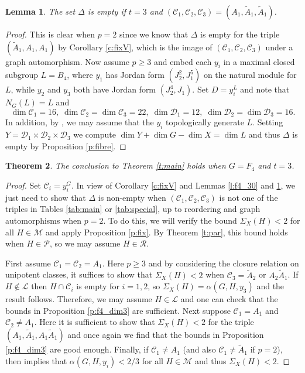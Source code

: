 \documentclass[twoside,a4paper,reqno,11pt]{amsart}
\renewcommand{\a}{\alpha}
\newcommand{\<}{\langle}
\renewcommand{\>}{\rangle}
\newcommand{\geqs}{\geqslant}
\renewcommand{\:}{\colon}
\theoremstyle{plain}
\newtheorem{thm}{Theorem}[section]
\newtheorem{lem}[thm]{Lemma}
\theoremstyle{definition}
\begin{document}
\begin{lem}\label{l:f4_300}
The set $\Delta$ is empty if $t=3$ and $(\mathcal{C}_1,\mathcal{C}_2,\mathcal{C}_3) = (A_1, \tilde{A}_1, \tilde{A}_1)$.
\end{lem}

\begin{proof}
This is clear when $p=2$ since we know that $\Delta$ is empty for the triple $(\tilde{A}_1, A_1,A_1)$ by Corollary \ref{c:fixV}, which is the image of $(\mathcal{C}_1,\mathcal{C}_2,\mathcal{C}_3)$ under a graph automorphism. Now assume $p \geqs 3$ and embed each $y_i$ in a maximal closed subgroup $L = B_4$, where $y_1$ has Jordan form $(J_2^2,J_1^5)$ on the natural module for $L$, while $y_2$ and $y_3$ both have Jordan form $(J_2^4,J_1)$. Set $D = y_i^L$ and note that 
$N_G(L) = L$ and 
\[
\dim \mathcal{C}_1 = 16, \; \dim \mathcal{C}_2 = \dim \mathcal{C}_3 = 22, \; \dim \mathcal{D}_1 = 12, \; \dim \mathcal{D}_2 = \dim \mathcal{D}_3 = 16.
\]
In addition, by \cite[Theorem 7]{BGG2}, we may assume that the $y_i$ topologically generate $L$. Setting $Y = \mathcal{D}_1 \times \mathcal{D}_2 \times \mathcal{D}_3$ we compute $\dim Y + \dim G - \dim X =\dim L$ and thus $\Delta$ is empty by Proposition \ref{p:fibre}.
\end{proof}

\begin{thm}\label{t:f4_3}
The conclusion to Theorem \ref{t:main} holds when $G = F_4$ and $t=3$.
\end{thm}

\begin{proof}
Set $\mathcal{C}_i = y_i^G$. In view of Corollary \ref{c:fixV} and Lemmas \ref{l:f4_30} and \ref{l:f4_300}, we just need to show that $\Delta$ is non-empty when $(\mathcal{C}_1,\mathcal{C}_2,\mathcal{C}_3)$ is not one of the triples in Tables \ref{tab:main} or \ref{tab:special}, up to reordering and graph automorphisms when $p=2$. To do this, we will verify the bound $\Sigma_X(H)<2$ for all $H \in \mathcal{M}$ and apply Proposition \ref{p:fix}. By Theorem \ref{t:par}, this bound holds when $H \in \mathcal{P}$, so we may assume $H \in \mathcal{R}$.

First assume $\mathcal{C}_1 = \mathcal{C}_2 = A_1$. Here $p \geqs 3$ and by considering the closure relation on unipotent classes, it suffices to show that $\Sigma_X(H)<2$ when $\mathcal{C}_3 = \tilde{A}_2$ or $A_2\tilde{A}_1$. If $H \not\in \mathcal{L}$ then $H \cap \mathcal{C}_i$ is empty for $i=1,2$, so $\Sigma_X(H) = \a(G,H,y_3)$ and the result follows. Therefore, we may assume $H \in \mathcal{L}$ and one can check that the bounds in Proposition \ref{p:f4_dim3} are sufficient. Next suppose  $\mathcal{C}_1 = A_1$ and $\mathcal{C}_2 \ne A_1$. Here it is sufficient to show that $\Sigma_X(H)<2$ for the triple $(A_1,\tilde{A}_1,A_1\tilde{A}_1)$ and once again we find that the bounds in Proposition \ref{p:f4_dim3} are good enough. Finally, if $\mathcal{C}_1 \ne A_1$ (and also $\mathcal{C}_1 \ne \tilde{A}_1$ if $p=2$), then \cite[Theorem 3.1]{BGG1} implies that $\a(G,H,y_i)<2/3$ for all $H \in \mathcal{M}$ and thus $\Sigma_X(H)<2$.
\end{proof}
\end{document}
